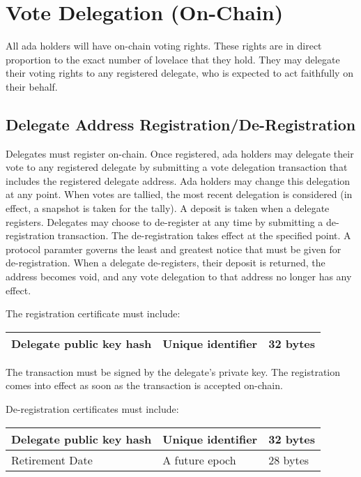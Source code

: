 \newpage
\section{Vote Delegation (On-Chain)}
\label{sect:delegation}

All ada holders will have on-chain voting rights.  These rights are in direct proportion to the exact number of lovelace that they hold.
They may delegate their voting rights to any registered delegate, who is expected to act faithfully on their behalf.

\subsection{Delegate Address Registration/De-Registration}
\label{sect:registration}

Delegates must register on-chain.  Once registered, ada holders may delegate their
vote to any registered delegate by submitting a vote delegation transaction that includes the registered delegate address.
Ada holders may change this delegation at any point.  When votes are tallied, the most recent delegation is considered (in effect, a snapshot is taken for the tally).
A deposit is taken when a delegate registers.  Delegates may choose to de-register at any time by submitting a de-registration transaction.  The de-registration takes effect
at the specified point.  A protocol paramter governs the least and greatest notice that must be given for de-registration.  When a delegate de-registers, their deposit is returned,
the address becomes void, and any vote delegation to that address no longer has any effect.

The registration certificate must include:

\begin{tabular}{||l|p{3in}|l||}
  \hline\hline
  Delegate public key hash & Unique identifier & 32 bytes
  \\\hline
  \hline
\end{tabular}

The transaction must be signed by the delegate's private key.  The registration comes into effect as soon as the transaction is accepted on-chain.

De-registration certificates must include:

\begin{tabular}{||l|p{3in}|l||}
  \hline\hline
  Delegate public key hash & Unique identifier & 32 bytes
  \\\hline
  Retirement Date & A future epoch & 28 bytes
  \\\hline
  \hline
\end{tabular}

